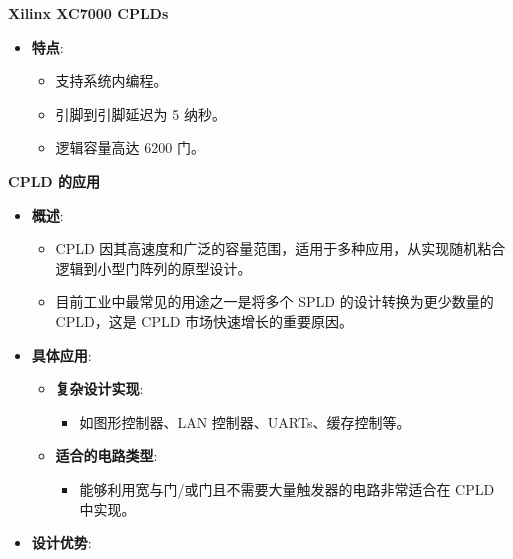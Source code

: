 \documentclass[
  ignorenonframetext,
  chinese,
]{beamer}
\providecommand{\tightlist}{%
  \setlength{\itemsep}{0pt}\setlength{\parskip}{0pt}}
\begin{document}
\begin{frame}
\begin{block}{\textbf{Xilinx XC7000 CPLDs}}
\begin{itemize}
  \begin{itemize}
  \tightlist
  \item
    \textbf{特点}:

    \begin{itemize}
    \tightlist
    \item
      支持系统内编程。
    \item
      引脚到引脚延迟为 5 纳秒。
    \item
      逻辑容量高达 6200 门。
    \end{itemize}
  \end{itemize}
\end{itemize}
\end{block}
\end{frame}

\begin{frame}
\begin{block}{\textbf{CPLD 的应用}}
\label{cpld-ux7684ux5e94ux7528}
\begin{itemize}
\tightlist
\item
  \textbf{概述}:

  \begin{itemize}
  \tightlist
  \item
    CPLD
    因其高速度和广泛的容量范围，适用于多种应用，从实现随机粘合逻辑到小型门阵列的原型设计。
  \item
    目前工业中最常见的用途之一是将多个 SPLD 的设计转换为更少数量的
    CPLD，这是 CPLD 市场快速增长的重要原因。
  \end{itemize}
\item
  \textbf{具体应用}:

  \begin{itemize}
  \tightlist
  \item
    \textbf{复杂设计实现}:

    \begin{itemize}
    \tightlist
    \item
      如图形控制器、LAN 控制器、UARTs、缓存控制等。
    \end{itemize}
  \item
    \textbf{适合的电路类型}:

    \begin{itemize}
    \tightlist
    \item
      能够利用宽与门/或门且不需要大量触发器的电路非常适合在 CPLD
      中实现。
    \end{itemize}
  \end{itemize}
\item
  \textbf{设计优势}:


\end{itemize}
\end{block}
\end{frame}
\end{document}
